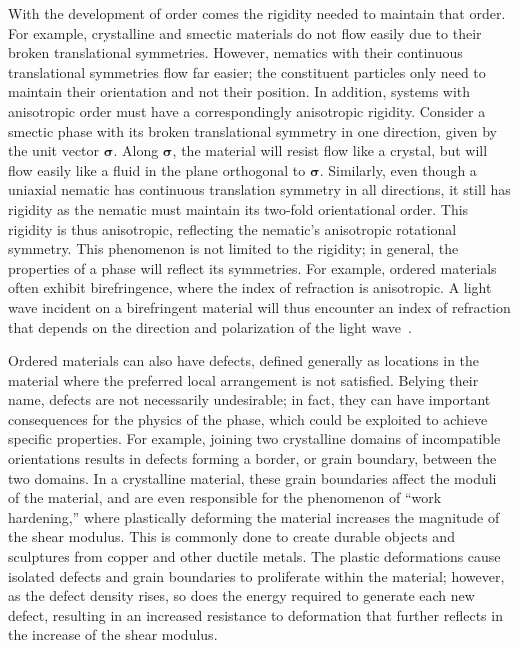 With the development of order comes the rigidity needed to maintain that order.
For example, crystalline and smectic materials do not flow easily due to their broken translational symmetries.
However, nematics with their continuous translational symmetries flow far easier; the constituent particles only need to maintain their orientation and not their position.
In addition, systems with anisotropic order must have a correspondingly anisotropic rigidity.
Consider a smectic phase with its broken translational symmetry in one direction, given by the unit vector $\bm{\sigma}$.
Along $\bm{\sigma}$, the material will resist flow like a crystal, but will flow easily like a fluid in the plane orthogonal to $\bm{\sigma}$.
Similarly, even though a uniaxial nematic has continuous translation symmetry in all directions, it still has rigidity as the nematic must maintain its two-fold orientational order.
This rigidity is thus anisotropic, reflecting the nematic's anisotropic rotational symmetry.
This phenomenon is not limited to the rigidity; in general, the properties of a phase will reflect its symmetries.
For example, ordered materials often exhibit birefringence, where the index of refraction is anisotropic.
A light wave incident on a birefringent material will thus encounter an index of refraction that depends on the direction and polarization of the light wave~\cite{RN175}.

Ordered materials can also have defects, defined generally as locations in the material where the preferred local arrangement is not satisfied.
Belying their name, defects are not necessarily undesirable; in fact, they can have important consequences for the physics of the phase, which could be exploited to achieve specific properties.
For example, joining two crystalline domains of incompatible orientations results in defects forming a border, or grain boundary, between the two domains.
In a crystalline material, these grain boundaries affect the moduli of the material, and are even responsible for the phenomenon of ``work hardening,'' where plastically deforming the material increases the magnitude of the shear modulus.
This is commonly done to create durable objects and sculptures from copper and other ductile metals.
The plastic deformations cause isolated defects and grain boundaries to proliferate within the material; however, as the defect density rises, so does the energy required to generate each new defect, resulting in an increased resistance to deformation that further reflects in the increase of the shear modulus.

